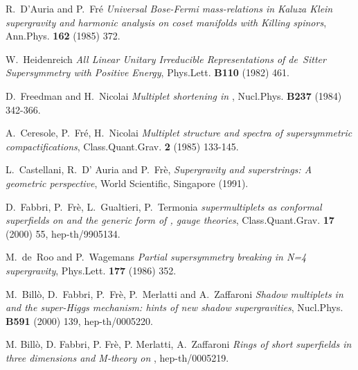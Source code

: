 \documentclass[a4paper,11pt]{article}
\begin{document}
\begin{thebibliography}{99}
R.~D'Auria and P.~Fr\'e {\it Universal Bose-Fermi mass-relations
in Kaluza Klein supergravity and harmonic analysis on coset
manifolds with Killing spinors}, Ann.Phys. {\bf 162} (1985) 372.

W.~Heidenreich {\it All Linear Unitary Irreducible Representations
of de~Sitter Supersymmetry with Positive Energy}, Phys.Lett. {\bf
B110} (1982) 461.

D.~Freedman and H.~Nicolai {\it Multiplet shortening in
\coordHE{}}, Nucl.Phys. {\bf B237} (1984) 342-366.

A.~Ceresole, P.~Fr\'e, H.~Nicolai {\it Multiplet structure and
spectra of \coordHE{} supersymmetric compactifications},
Class.Quant.Grav. {\bf 2} (1985) 133-145.

L.~Castellani, R.~D' Auria and P.~Fr\`e, {\it Supergravity and
superstrings: A geometric perspective}, World Scientific,
Singapore (1991).

D.~Fabbri, P.~Fr\`e, L.~Gualtieri, P.~Termonia {\it {}\coordHE{} supermultiplets as conformal superfields on \coordHE{} and the generic form of \coordHE{}, \coordHE{} gauge
theories}, Class.Quant.Grav. {\bf 17} (2000) 55, hep-th/9905134.

M.~de~Roo and P.~Wagemans {\it Partial supersymmetry breaking in
N=4 supergravity}, Phys.Lett. {\bf 177} (1986) 352.

M.~Bill\`o, D.~Fabbri, P.~Fr\`e, P.~Merlatti and A.~Zaffaroni {\it
Shadow multiplets in \coordHE{} and the super-Higgs mechanism:
hints of new shadow supergravities}, Nucl.Phys. {\bf B591} (2000)
139, hep-th/0005220.

M. Bill\`o, D. Fabbri, P. Fr\`e, P. Merlatti, A.~Zaffaroni {\it
Rings of short \coordHE{} superfields in three dimensions and
M-theory on \coordHE{}}, hep-th/0005219.

\end{thebibliography}
\end{document}
